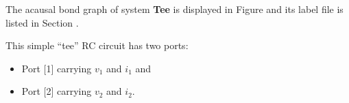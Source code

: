 

   The acausal bond graph of system \textbf{Tee} is
   displayed in Figure  and its label
   file is listed in Section .

This simple ``tee'' RC circuit has two ports:
\begin{itemize}
\item Port [1] carrying $v_1$ and $i_1$ and
\item Port [2] carrying $v_2$ and $i_2$.
\end{itemize}


